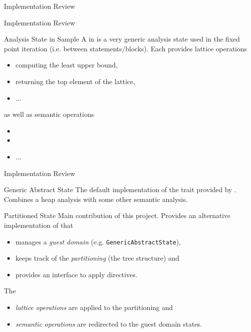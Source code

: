 \documentclass{beamer}
\begin{document}
\begin{section}{Implementation Review}


	\begin{frame}[t]{Implementation Review}
		\begin{block}{Analysis State in Sample}
			A  in \sample is a very generic analysis state used in the fixed point iteration (i.e. between statements/blocks). Each  provides lattice operations
			\begin{itemize}
				\item {} computing the least upper bound,
				\item {} returning the top element of the lattice,
				\item ...
			\end{itemize}
			as well as semantic operations
			\begin{itemize}
				\item {} 
				\item {} 
				\item ...\\
			\end{itemize}
		\end{block}
	\end{frame}


	\begin{frame}[t]{Implementation Review}
		\begin{block}{Generic Abstract State}
			The default implementation of the  trait provided by \sample. Combines a heap analysis with some other semantic analysis. 
		\end{block}

		\begin{block}{Partitioned State}
			Main contribution of this project. Provides an alternative implementation of  that
			\begin{itemize}
				\item manages a \emph{guest domain} (e.g. \texttt{GenericAbstractState}),
				\item keeps track of the \emph{partitioning} (the tree structure) and 
				\item provides an interface to apply directives.
			\end{itemize}
			The
			\begin{itemize}
				\item \emph{lattice operations} are applied to the partitioning and
				\item \emph{semantic operations} are redirected to the guest domain states.
			\end{itemize}
		\end{block}
	\end{frame}


\end{section}
\end{document}
